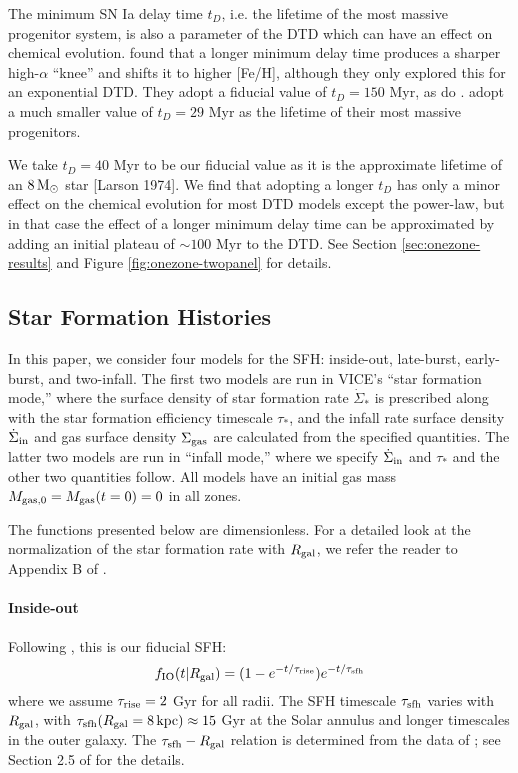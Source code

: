 \documentclass[twocolumn,twocolappendix,linenumbers,trackchanges]{aastex631}
\begin{document}
The minimum SN Ia delay time $t_D$, i.e. the lifetime of the most massive progenitor system, is also a parameter of the DTD which can have an effect on chemical evolution. \citet{Andrews2017-ChemicalEvolution} found that a longer minimum delay time produces a sharper high-$\alpha$ ``knee'' and shifts it to higher [Fe/H], although they only explored this for an exponential DTD. They adopt a fiducial value of $t_D=150$ Myr, as do \citet{Johnson2021-Migration}. \citet{Poulhazan2018-PrecisionPollution} adopt a much smaller value of $t_D=29$ Myr as the lifetime of their most massive progenitors.

We take $t_D=40$ Myr to be our fiducial value as it is the approximate lifetime of an $8\,{\rm M}_\odot$ star [Larson 1974]. We find that adopting a longer $t_D$ has only a minor effect on the chemical evolution for most DTD models except the power-law, but in that case the effect of a longer minimum delay time can be approximated by adding an initial plateau of $\sim100$ Myr to the DTD. See Section \ref{sec:onezone-results} and Figure \ref{fig:onezone-twopanel} for details.

\subsection{Star Formation Histories}
\label{sec:sfh}

In this paper, we consider four models for the SFH: inside-out, late-burst, early-burst, and two-infall. The first two models are run in VICE's ``star formation mode,'' where the surface density of star formation rate $\dot\Sigma_*$ is prescribed along with the star formation efficiency timescale $\tau_*$, and the infall rate surface density $\dot\Sigma_{\rm in}$ and gas surface density $\Sigma_{\rm gas}$ are calculated from the specified quantities. The latter two models are run in ``infall mode,'' where we specify $\dot\Sigma_{\rm in}$  and $\tau_*$ and the other two quantities follow. All models have an initial gas mass $M_{\rm gas,0} = M_{\rm gas}(t=0) = 0$ in all zones.

The functions presented below are dimensionless. For a detailed look at the normalization of the star formation rate with $R_{\rm gal}$, we refer the reader to Appendix B of \citet{Johnson2021-Migration}.

\paragraph{Inside-out} Following \citet{Johnson2021-Migration}, this is our fiducial SFH:
\begin{equation}
    f_{\rm IO}(t|R_{\rm gal}) = (1 - e^{-t/\tau_{\rm rise}}) e^{-t/\tau_{\rm sfh}}
    \label{eq:insideout-sfh}
\end{equation}
where we assume $\tau_{\rm rise}=2$ Gyr for all radii. The SFH timescale $\tau_{\rm sfh}$ varies with $R_{\rm gal}$, with $\tau_{\rm sfh}(R_{\rm gal}=8\,\rm{kpc})\approx15$ Gyr at the Solar annulus and longer timescales in the outer galaxy. The $\tau_{\rm sfh} - R_{\rm gal}$ relation is determined from the data of \citet{Sanchez2020-StarFormationTimescales}; see Section 2.5 of \citet{Johnson2021-Migration} for the details.
\end{document}
